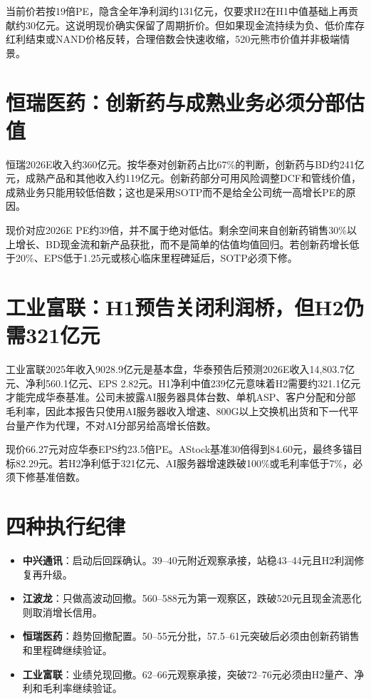 当前价若按19倍PE，隐含全年净利润约131亿元，仅要求H2在H1中值基础上再贡献约30亿元。这说明现价确实保留了周期折价。但如果现金流持续为负、低价库存红利结束或NAND价格反转，合理倍数会快速收缩，520元熊市价值并非极端情景。

\section{恒瑞医药：创新药与成熟业务必须分部估值}

恒瑞2026E收入约360亿元。按华泰对创新药占比67\%的判断，创新药与BD约241亿元，成熟产品和其他收入约119亿元。创新药部分可用风险调整DCF和管线价值，成熟业务只能用较低倍数；这也是采用SOTP而不是给全公司统一高增长PE的原因。

现价对应2026E PE约39倍，并不属于绝对低估。剩余空间来自创新药销售30\%以上增长、BD现金流和新产品获批，而不是简单的估值均值回归。若创新药增长低于20\%、EPS低于1.25元或核心临床里程碑延后，SOTP必须下修。

\section{工业富联：H1预告关闭利润桥，但H2仍需321亿元}

工业富联2025年收入9028.9亿元是基本盘，华泰预告后预测2026E收入14,803.7亿元、净利560.1亿元、EPS 2.82元。H1净利中值239亿元意味着H2需要约321.1亿元才能完成华泰基准。公司未披露AI服务器具体台数、单机ASP、客户分配和分部毛利率，因此本报告只使用AI服务器收入增速、800G以上交换机出货和下一代平台量产作为代理，不对AI分部另给高增长倍数。

现价66.27元对应华泰EPS约23.5倍PE。AStock基准30倍得到84.60元，最终多锚目标82.29元。若H2净利低于321亿元、AI服务器增速跌破100\%或毛利率低于7\%，必须下修基准倍数。

\section{四种执行纪律}

\begin{itemize}
  \item \textbf{中兴通讯}：启动后回踩确认。39--40元附近观察承接，站稳43--44元且H2利润修复再升级。
  \item \textbf{江波龙}：只做高波动回撤。560--588元为第一观察区，跌破520元且现金流恶化则取消增长信用。
  \item \textbf{恒瑞医药}：趋势回撤配置。50--55元分批，57.5--61元突破后必须由创新药销售和里程碑继续验证。
  \item \textbf{工业富联}：业绩兑现回撤。62--66元观察承接，突破72--76元必须由H2量产、净利和毛利率继续验证。
\end{itemize}
